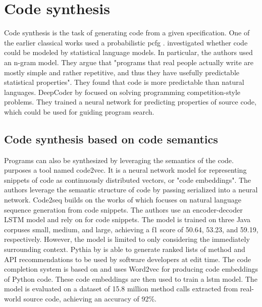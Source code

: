 \section{Code synthesis}
\label{sec:code-synthesis}
Code synthesis is the task of generating code from a given specification. One of the earlier classical works used a probabilistic \acrfull{pcfg} \cite{allamanis2015bimodal}. \textcite{hindle2012natural} investigated whether code could be modeled by statistical language models. In particular, the authors used an n-gram model. They argue that "programs that real people actually write are mostly simple and rather repetitive, and thus they have usefully predictable statistical properties". They found that code is more predictable than natural languages. DeepCoder by \textcite{balog2017deepcoder} focused on solving programming competition-style problems. They trained a neural network for predicting properties of source code, which could be used for guiding program search.

\subsection{Code synthesis based on code semantics}
Programs can also be synthesized by leveraging the semantics of the code. \textcite{alon2018code2vec} purposes a tool named code2vec. It is a neural network model for representing snippets of code as continuously distributed vectors, or "code embeddings". The authors leverage the semantic structure of code by passing serialized  into a neural network. Code2seq \cite{alon2018code2seq} builds on the works of \textcite{alon2018code2vec} which focuses on natural language sequence generation from code snippets. The authors use an encoder-decoder LSTM model and rely on  for code snippets. The model is trained on three Java corpuses small, medium, and large, achieving a \gls{f1} score of 50.64, 53.23, and 59.19, respectively. However, the model is limited to only considering the immediately surrounding context. Pythia by \textcite{svyatkovskiy2019pyhia} is able to generate ranked lists of method and API recommendations to be used by software developers at edit time. The code completion system is based on  and uses Word2vec for producing code embeddings of Python code. These code embeddings are then used to train a \gls{lstm} model. The model is evaluated on a dataset of 15.8 million method calls extracted from real-world source code, achieving an accuracy of 92\%.

